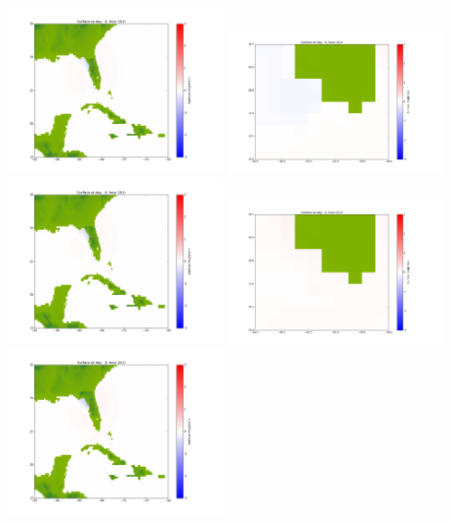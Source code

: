 \documentclass[11pt]{article}
\begin{document}
\includegraphics[width=0.475\textwidth]{frame0032fig1002.png}
\vskip 10pt 
\includegraphics[width=0.475\textwidth]{frame0033fig1001.png}
\includegraphics[width=0.475\textwidth]{frame0033fig1002.png}
\vskip 10pt 
\includegraphics[width=0.475\textwidth]{frame0034fig1001.png}
\includegraphics[width=0.475\textwidth]{frame0034fig1002.png}
\end{document}
